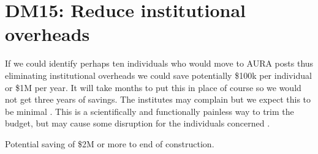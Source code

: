\section{DM15: Reduce institutional overheads}\label{sect:dm15}

If we could identify perhaps ten individuals who would move to AURA posts\newtext{,} thus eliminating institutional overheads\newtext{,}  
we could save potentially \$100k per individual or \$1M per year.
It will take months to put this in place of course so we would not get three years of savings.
The institutes may complain but we expect this to be minimal \newtext{}.
This is a scientifically and functionally painless way to trim the budget, but may cause some disruption for the individuals concerned .

Potential saving of \$2M  or more to end of construction.



